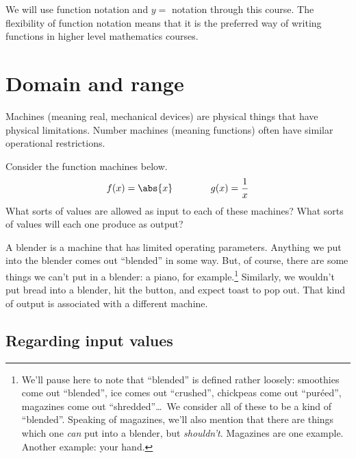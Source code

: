 We will use function notation and $y =$ notation through this course. The flexibility of function notation means that it is the preferred way of writing functions in higher level mathematics courses.


\section{Domain and range}
\label{cref:domandrange}


Machines (meaning real, mechanical devices) are physical things that have physical limitations. Number machines (meaning functions) often have similar operational restrictions.

\begin{boxexplore}
Consider the function machines below.
\[f(x) = \abs{x} \qquad\qquad g(x)=\frac{1}{x}\]
What sorts of values are allowed as input to each of these machines? What sorts of values will each one produce as output?
\end{boxexplore} %

A blender is a machine that has limited operating parameters. Anything we put into the blender comes out ``blended'' in some way. But, of course, there are some things we can't put in a blender: a piano, for example.\footnote{We'll pause here to note that ``blended'' is defined rather loosely: smoothies come out ``blended'', ice comes out ``crushed'', chickpeas come out ``pur\'eed'', magazines come out ``shredded''\ldots\ We consider all of these to be a kind of ``blended''. Speaking of magazines, we'll also mention that there are things which one \textit{can} put into a blender, but \textit{shouldn't}. Magazines are one example. Another example: your hand.} Similarly, we wouldn't put bread into a  blender, hit the button, and expect toast to pop out. That kind of output is associated with a different machine.

\subsection{Regarding input values}

